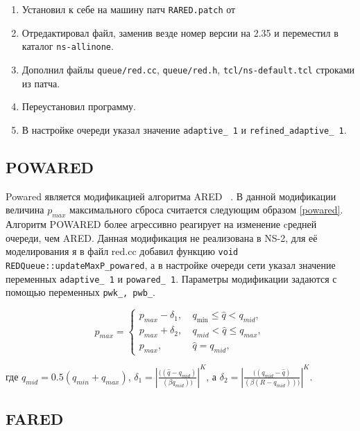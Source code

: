 \begin{enumerate}
\item Установил к себе на машину патч \verb|RARED.patch| от 
\item Отредактировал файл, заменив везде номер версии на 2.35 и переместил в каталог \verb|ns-allinone|.
\item Дополнил файлы \verb|queue/red.cc|, \verb|queue/red.h|, \verb|tcl/ns-default.tcl| строками из патча.
\item Переустановил программу.
\item В настройке очереди указал значение \verb|adaptive_ 1| и 
\verb|refined_adaptive_ 1|.
\end{enumerate}
 

\subsection{POWARED}


Powared является модификацией алгоритма ARED ~\cite{Powared}. В данной модификации величина $p_{max}$ максимального сброса считается следующим образом \eqref{powared}. Алгоритм POWARED более агрессивно реагирует на изменение cредней очереди, чем ARED. Данная модификация не реализована в NS-2, для её моделирования я в файл red.cc добавил функцию \verb|void REDQueue::updateMaxP_powared|, а в настройке очереди сети указал значение переменных \verb|adaptive_ 1| и \verb|powared_ 1|. 
Параметры модификации задаются с помощью переменных \verb|pwk_, pwb_|.

\begin{equation}
\label{powared}
p_{max} =\begin{cases}
        p_{max}-\delta_1, &  \  q_{\min} \leqslant \hat{q} < q_{mid}, 
        \\
        p_{max}+\delta_2, & \ q_{mid} < \hat{q}  \leqslant q_{max}, 
        \\
        p_{max}, &  \ \hat{q} =  q_{mid},
\end{cases}
\end{equation}

где $q_{mid} = 0.5(q_{min} + q_{max})$, 
$\delta_1 = |\frac{((\hat{q} - q_{mid})}{(\beta q_{mid}))}|^K $, а $\delta_2 = |\frac{((q_{mid} - \hat{q})}{(\beta (R -q_{mid})))}|^K.$


\subsection{FARED}

